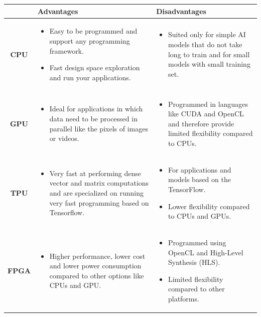 \newpage

\begin{table}[!htp]
    \centering
    \begin{tabular}{@{} c p{14em} p{14em} @{}}
        \toprule
        & \textbf{Advantages} & \textbf{Disadvantages} \\
        \midrule
        \textbf{CPU} & 
        \begin{itemize}
            \item Easy to be programmed and support any programming framework.
            \item Fast design space exploration and run your applications.
        \end{itemize}
        & \begin{itemize}
            \item Suited only for simple AI models that do not take long to train and for small models with small training set.
        \end{itemize} \\
        \cmidrule{1-3}
        \textbf{GPU} & \begin{itemize}
            \item Ideal for applications in which data need to be processed in parallel like the pixels of images or videos.
        \end{itemize} & \begin{itemize}
            \item Programmed in languages like CUDA and OpenCL and therefore provide limited flexibility compared to CPUs.
        \end{itemize} \\
        \cmidrule{1-3}
        \textbf{TPU} & \begin{itemize}
            \item Very fast at performing dense vector and matrix computations and are specialized on running very fast programming based on Tensorflow.
        \end{itemize} & \begin{itemize}
            \item For applications and models based on the TensorFlow.
            \item Lower flexibility compared to CPUs and GPUs.
        \end{itemize} \\
        \cmidrule{1-3}
        \textbf{FPGA} & \begin{itemize}
            \item Higher performance, lower cost and lower power consumption compared to other options like CPUs and GPU.
        \end{itemize} & \begin{itemize}
            \item Programmed using OpenCL and High-Level Synthesis (HLS).
            \item Limited flexibility compared to other platforms.
        \end{itemize} \\
        \bottomrule
    \end{tabular}
\end{table}

